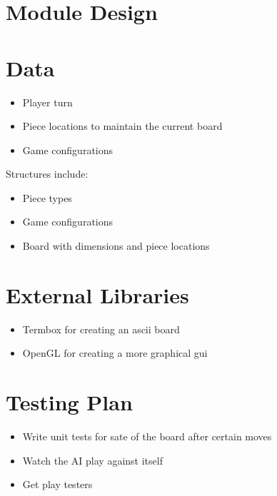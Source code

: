\documentclass[11pt, oneside]{article}
\begin{document}
\section{Module Design}

\section{Data}
\begin{itemize}
\item Player turn
\item Piece locations to maintain the current board
\item Game configurations
\end{itemize}
Structures include:
\begin{itemize}
\item Piece types
\item Game configurations
\item Board with dimensions and piece locations
\end{itemize}

\section{External Libraries}
\begin{itemize}
\item Termbox for creating an ascii board
\item OpenGL for creating a more graphical gui
\end{itemize}

\section{Testing Plan}
\begin{itemize}
\item Write unit tests for sate of the board after certain moves
\item Watch the AI play against itself
\item Get play testers
\end{itemize}
\end{document}
